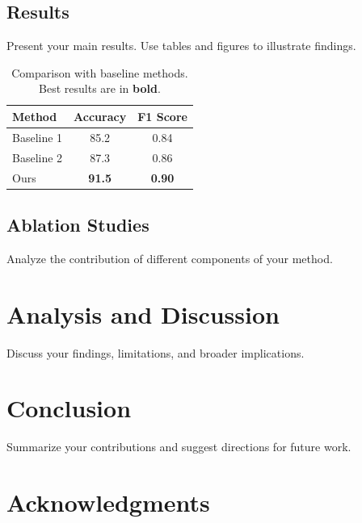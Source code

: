 \documentclass{article}
\begin{document}
\subsection{Results}

Present your main results. Use tables and figures to illustrate findings.

\begin{table}[t]
    \caption{Comparison with baseline methods. Best results are in \textbf{bold}.}
    \label{tab:main_results}
    \vskip 0.15in
    \begin{center}
    \begin{small}
    \begin{sc}
    \begin{tabular}{lcc}
        \toprule
        Method & Accuracy & F1 Score \\
        \midrule
        Baseline 1 & 85.2 & 0.84 \\
        Baseline 2 & 87.3 & 0.86 \\
        Ours & \textbf{91.5} & \textbf{0.90} \\
        \bottomrule
    \end{tabular}
    \end{sc}
    \end{small}
    \end{center}
    \vskip -0.1in
\end{table}

\subsection{Ablation Studies}

Analyze the contribution of different components of your method.

\section{Analysis and Discussion}
\label{sec:discussion}

Discuss your findings, limitations, and broader implications.

\section{Conclusion}
\label{sec:conclusion}

Summarize your contributions and suggest directions for future work.

\section*{Acknowledgments}
\end{document}
